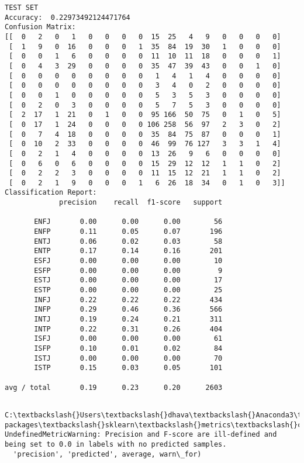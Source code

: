 \documentclass[11pt]{article}
\begin{document}
\begin{Verbatim}[commandchars=\\\{\}]
TEST SET
Accuracy:  0.22973492124471764
Confusion Matrix:
[[  0   2   0   1   0   0   0   0  15  25   4   9   0   0   0   0]
 [  1   9   0  16   0   0   0   1  35  84  19  30   1   0   0   0]
 [  0   0   1   6   0   0   0   0  11  10  11  18   0   0   0   1]
 [  0   4   3  29   0   0   0   0  35  47  39  43   0   0   1   0]
 [  0   0   0   0   0   0   0   0   1   4   1   4   0   0   0   0]
 [  0   0   0   0   0   0   0   0   3   4   0   2   0   0   0   0]
 [  0   0   1   0   0   0   0   0   5   3   5   3   0   0   0   0]
 [  0   2   0   3   0   0   0   0   5   7   5   3   0   0   0   0]
 [  2  17   1  21   0   1   0   0  95 166  50  75   0   1   0   5]
 [  0  17   1  24   0   0   0   0 106 258  56  97   2   3   0   2]
 [  0   7   4  18   0   0   0   0  35  84  75  87   0   0   0   1]
 [  0  10   2  33   0   0   0   0  46  99  76 127   3   3   1   4]
 [  0   2   1   4   0   0   0   0  13  26   9   6   0   0   0   0]
 [  0   6   0   6   0   0   0   0  15  29  12  12   1   1   0   2]
 [  0   2   2   3   0   0   0   0  11  15  12  21   1   1   0   2]
 [  0   2   1   9   0   0   0   1   6  26  18  34   0   1   0   3]]
Classification Report:
             precision    recall  f1-score   support

       ENFJ       0.00      0.00      0.00        56
       ENFP       0.11      0.05      0.07       196
       ENTJ       0.06      0.02      0.03        58
       ENTP       0.17      0.14      0.16       201
       ESFJ       0.00      0.00      0.00        10
       ESFP       0.00      0.00      0.00         9
       ESTJ       0.00      0.00      0.00        17
       ESTP       0.00      0.00      0.00        25
       INFJ       0.22      0.22      0.22       434
       INFP       0.29      0.46      0.36       566
       INTJ       0.19      0.24      0.21       311
       INTP       0.22      0.31      0.26       404
       ISFJ       0.00      0.00      0.00        61
       ISFP       0.10      0.01      0.02        84
       ISTJ       0.00      0.00      0.00        70
       ISTP       0.15      0.03      0.05       101

avg / total       0.19      0.23      0.20      2603


    \end{Verbatim}

    \begin{Verbatim}[commandchars=\\\{\}]
C:\textbackslash{}Users\textbackslash{}dhava\textbackslash{}Anaconda3\textbackslash{}lib\textbackslash{}site-packages\textbackslash{}sklearn\textbackslash{}metrics\textbackslash{}classification.py:1135: UndefinedMetricWarning: Precision and F-score are ill-defined and being set to 0.0 in labels with no predicted samples.
  'precision', 'predicted', average, warn\_for)

    \end{Verbatim}
\end{document}
